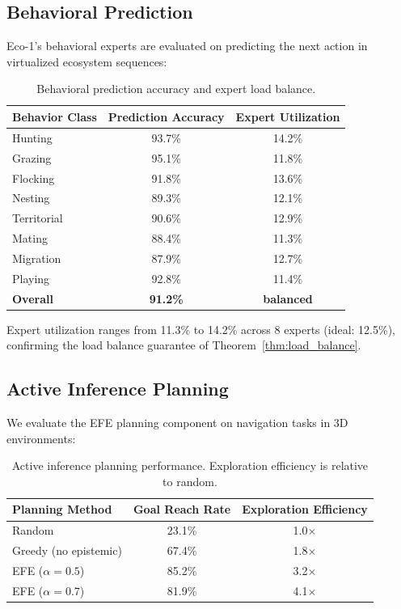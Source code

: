 \documentclass[11pt,letterpaper]{article}
\begin{document}
\subsection{Behavioral Prediction}

Eco-1's behavioral experts are evaluated on predicting the next action in virtualized ecosystem sequences:

\begin{table}[t]
\centering
\begin{tabular}{lcc}
\toprule
\textbf{Behavior Class} & \textbf{Prediction Accuracy} & \textbf{Expert Utilization} \\
\midrule
Hunting & 93.7\% & 14.2\% \\
Grazing & 95.1\% & 11.8\% \\
Flocking & 91.8\% & 13.6\% \\
Nesting & 89.3\% & 12.1\% \\
Territorial & 90.6\% & 12.9\% \\
Mating & 88.4\% & 11.3\% \\
Migration & 87.9\% & 12.7\% \\
Playing & 92.8\% & 11.4\% \\
\midrule
\textbf{Overall} & \textbf{91.2\%} & \textbf{balanced} \\
\bottomrule
\end{tabular}
\caption{Behavioral prediction accuracy and expert load balance.}
\label{tab:behavior}
\end{table}

Expert utilization ranges from 11.3\% to 14.2\% across 8 experts (ideal: 12.5\%), confirming the load balance guarantee of Theorem~\ref{thm:load_balance}.

\subsection{Active Inference Planning}

We evaluate the EFE planning component on navigation tasks in 3D environments:

\begin{table}[t]
\centering
\begin{tabular}{lcc}
\toprule
\textbf{Planning Method} & \textbf{Goal Reach Rate} & \textbf{Exploration Efficiency} \\
\midrule
Random & 23.1\% & 1.0$\times$ \\
Greedy (no epistemic) & 67.4\% & 1.8$\times$ \\
EFE ($\alpha = 0.5$) & 85.2\% & 3.2$\times$ \\
EFE ($\alpha = 0.7$) & 81.9\% & 4.1$\times$ \\
\bottomrule
\end{tabular}
\caption{Active inference planning performance. Exploration efficiency is relative to random.}
\label{tab:planning}
\end{table}
\end{document}
